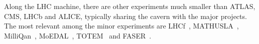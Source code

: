 Along the LHC machine, there are other experiments much smaller than ATLAS, CMS, LHCb and ALICE, typically sharing the cavern with the major projects. 
The most relevant among the minor experiments are LHCf~\cite{LHCf:2008lfy}, MATHUSLA~\cite{MATHUSLA:2018bqv}, MilliQan~\cite{Yoo:2645863}, 
MoEDAL~\cite{Mitsou:2017doz}, TOTEM~\cite{Collaboration_totem_2008} and FASER~\cite{FASER:2018ceo}.
 
\begin{comment}
\begin{itemize}
  \item \textbf{The Large Hadron Collider forward (LHCf)}~\cite{LHCf:2008lfy}: Uses particles thrown forward by collisions in the Large Hadron 
  			Collider as a source to simulate cosmic rays in laboratory conditions. It shares its cavern with the ATLAS detector~\cite{Adriani:926196}.
  \item  \textbf{The Massive Timing Hodoscope for Ultra Stable neutraL pArticles (MATHUSLA)}~\cite{MATHUSLA:2018bqv}: Is dedicated large-volume 
  			displaced vertex detector for the HL-LHC on the surface above ATLAS or CMS for the search for neutral long-lived particles.
  \item  \textbf{MilliQan}~\cite{Yoo:2645863, PhysRevD.102.032002}: Consists on a small-scale detector experiment aiming to detect millicharged particles, i.e., particles with charges 
  			much smaller than that of the electron.
  \item \textbf{Monopole and exotic particle detector at the LHC (MoEDAL)}~\cite{Mitsou:2017doz}: Deployed at LHCb cavern, it is optimised to detect 
  			highly ionising particles such as magnetic monopoles, dyons and multiple-electrically charged stable massive particles predicted in a number 
			of theoretical scenarios. %
  \item \textbf{TOTEM}~\cite{Collaboration_totem_2008}:  Aims to measure the total cross-section of $\Pproton \Pproton$ interaction using a luminosity-independent method 
  			and study elastic and diffractive scattering at the LHC. As CERN longest experiment, TOTEM detectors are spread across almost half a kilometre 
			around the CMS IP.
  \item \textbf{ForwArd Search ExpeRiment (FASER)} ~\cite{FASER:2018bac, FASER:2018ceo}: Designed to search for new, yet undiscovered, light and 
  			weakly-interacting particles and study the interactions of high-energy neutrinos.
\end{itemize}
\end{comment}

